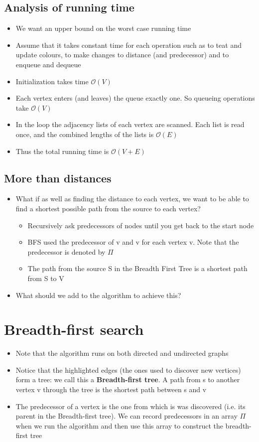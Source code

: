 \documentclass{article}[18pt]
\begin{document}
\subsection{Analysis of running time}
\begin{itemize}
\item We want an upper bound on the worst case running time
\item Assume that it takes constant time for each operation such as to teat and update colours, to make changes to distance (and predecessor) and to enqueue and dequeue
\item Initialization takes time $\mathcal{O}(V)$
\item Each vertex enters (and leaves) the queue exactly one. So queueing operations take $\mathcal{O}(V)$
\item In the loop the adjacency lists of each vertex are scanned. Each list is read once, and the combined lengths of the lists is $\mathcal{O}(E)$
\item Thus the total running time is $\mathcal{O}(V+E)$
\end{itemize}
\subsection{More than distances}
\begin{itemize}
	\item What if as well as finding the distance to each vertex, we want to be able to find a shortest possible path from the source to each vertex?
	\begin{itemize}
		\item Recursively ask predecessors of nodes until you get back to the start node
		\item BFS used the predecessor of v and v for each vertex v. Note that the predecessor is denoted by $\Pi$
		\item The path from the source S in the Breadth First Tree is a shortest path from S to V 
	\end{itemize}
	
	
	\item What should we add to the algorithm to achieve this?
\end{itemize}
\section{Breadth-first search}
\begin{itemize}
	\item Note that the algorithm runs on both directed and undirected graphs
	\item Notice that the highlighted edges (the ones used to discover new vertices) form a tree: we call this a \textbf{Breadth-first tree}. A path from s to another vertex v through the tree is the shortest path between s and v
	\item The predecessor of a vertex is the one from which is was discovered (i.e. its parent in the Breadth-first tree). We can record predecessors in an array $\Pi$ when we run the algorithm and then use this array to construct the breadth-first tree
\end{itemize}
\end{document}
